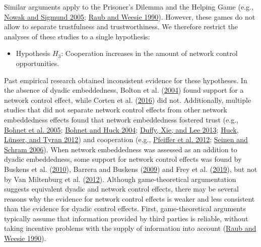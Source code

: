 \documentclass[
  11pt,
]{article}
\providecommand{\tightlist}{%
  \setlength{\itemsep}{0pt}\setlength{\parskip}{0pt}}
\begin{document}
\noindent
Similar arguments apply to the Prisoner's Dilemma and the Helping Game (e.g., \protect\hyperlink{ref-nowak_sigmund_evolution_2005}{Nowak and Sigmund 2005}; \protect\hyperlink{ref-raub_weesie_reputation_1990}{Raub and Weesie 1990}).
However, these games do not allow to separate trustfulness and trustworthiness.
We therefore restrict the analyses of these studies to a single hypothesis:

\begin{itemize}
\tightlist
\item
  Hypothesis \(H_3\): Cooperation increases in the amount of network control opportunities.
\end{itemize}

Past empirical research obtained inconsistent evidence for these hypotheses.
In the absence of dyadic embeddedness, Bolton et al. (\protect\hyperlink{ref-bolton_electronic_2004}{2004}) found support for a network control effect, while Corten et al. (\protect\hyperlink{ref-corten_etal_reputation_2016}{2016}) did not.
Additionally, multiple studies that did not separate network control effects from other network embeddedness effects found that network embeddedness fostered trust (e.g., \protect\hyperlink{ref-bohnet_learning_2005}{Bohnet et al. 2005}; \protect\hyperlink{ref-bohnet_huck_2004}{Bohnet and Huck 2004}; \protect\hyperlink{ref-duffy2013social}{Duffy, Xie, and Lee 2013}; \protect\hyperlink{ref-huck_competition_2012}{Huck, Lünser, and Tyran 2012}) and cooperation (e.g., \protect\hyperlink{ref-pfeiffer_etal_value_2012}{Pfeiffer et al. 2012}; \protect\hyperlink{ref-seinen_schram_social_2006}{Seinen and Schram 2006}).
When network embeddedness was assessed as an addition to dyadic embeddedness, some support for network control effects was found by Buskens et al. (\protect\hyperlink{ref-buskens_raub_veer_triads_2010}{2010}), Barrera and Buskens (\protect\hyperlink{ref-barrera_buskens_third_2009}{2009}) and Frey et al. (\protect\hyperlink{ref-frey_buskens_investments_2019}{2019}), but not by Van Miltenburg et al. (\protect\hyperlink{ref-miltenburg_buskens_triads_2012}{2012}).
Although game-theoretical argumentation suggests equivalent dyadic and network control effects, there may be several reasons why the evidence for network control effects is weaker and less consistent than the evidence for dyadic control effects.
First, game-theoretical arguments typically assume that information provided by third parties is reliable, without taking incentive problems with the supply of information into account (\protect\hyperlink{ref-raub_weesie_reputation_1990}{Raub and Weesie 1990}).
\end{document}

